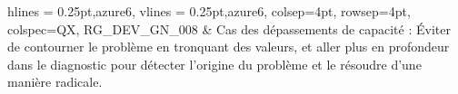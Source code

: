 \begin{appendices}
\begin{longtblr}[caption={Extrait des règles et pratiques de développement logiciel instaurées par Cegedim SRH}, label={tab:dev}]{
    hlines = {0.25pt,azure6},
    vlines = {0.25pt,azure6},
    colsep=4pt,
    rowsep=4pt,
	colspec={QX},
}
RG\_DEV\_GN\_008 & Cas des dépassements de capacité :
Éviter de contourner le problème en tronquant des valeurs, et aller plus en profondeur dans le diagnostic pour détecter l’origine du problème et le résoudre d’une manière radicale.

\end{longtblr}
\end{appendices}
